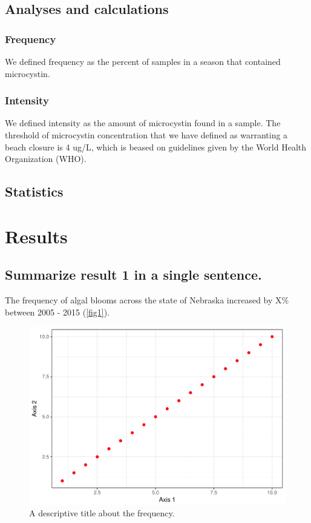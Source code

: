 \documentclass[11pt,]{article}
\makeatletter
\def\maxwidth{\ifdim\Gin@nat@width>\linewidth\linewidth
\else\Gin@nat@width\fi}
\let\Oldincludegraphics\includegraphics
\renewcommand{\includegraphics}[1]{\Oldincludegraphics[width=\maxwidth]{#1}}
\makeatother
\begin{document}
\subsection{Analyses and calculations}\label{analyses-and-calculations}

\subsubsection{Frequency}\label{frequency}

We defined frequency as the percent of samples in a season that
contained microcystin.

\subsubsection{Intensity}\label{intensity}

We defined intensity as the amount of microcystin found in a sample. The
threshold of microcystin concentration that we have defined as
warranting a beach closure is 4 ug/L, which is beased on guidelines
given by the World Health Organization (WHO).

\subsection{Statistics}\label{statistics}

\section{Results}\label{results}

\subsection{Summarize result 1 in a single
sentence.}\label{summarize-result-1-in-a-single-sentence.}

The frequency of algal blooms across the state of Nebraska increased by
X\% between 2005 - 2015 (\autoref{fig1}).

\begin{figure}[htbp]
\centering
\includegraphics{wickham-thesis_files/figure-latex/fig1-1.pdf}
\caption{A descriptive title about the frequency. \label{fig1}}
\end{figure}
\end{document}

